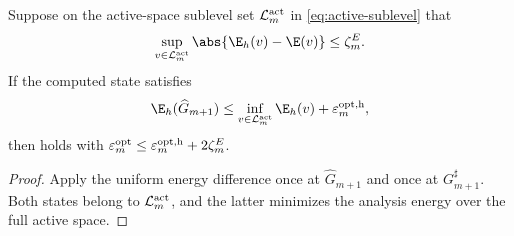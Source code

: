 \begin{lemma}
\label{lem:energy-transfer}
Suppose on the active-space sublevel set \(\mathcal L_m^{\rm act}\) in
\cref{eq:active-sublevel} that
\[
 \sup_{v\in\mathcal L_m^{\rm act}}
 \abs{\E_h(v)-\E(v)}\leq\zeta_m^E.
\]
If the computed state satisfies
\[
 \E_h(\widehat G_{m+1})\leq
 \inf_{v\in\mathcal L_m^{\rm act}}\E_h(v)+\varepsilon_m^{\rm opt,h},
\]
then  holds with
\(\varepsilon_m^{\rm opt}\leq\varepsilon_m^{\rm opt,h}+2\zeta_m^E\).
\end{lemma}

\begin{proof}
Apply the uniform energy difference once at \(\widehat G_{m+1}\) and once at
\(G_{m+1}^{\sharp}\). Both states belong to \(\mathcal L_m^{\rm act}\), and the latter minimizes the analysis
energy over the full active space.
\end{proof}
